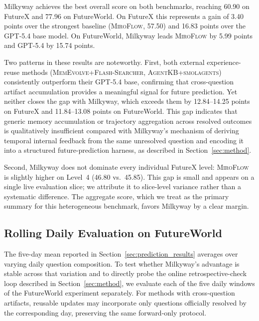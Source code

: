 Milkyway achieves the best overall score on both benchmarks, reaching 60.90 on FutureX and 77.96 on FutureWorld. On FutureX this represents a gain of 3.40 points over the strongest baseline (\textsc{MiroFlow}, 57.50) and 16.83 points over the GPT-5.4 base model. On FutureWorld, Milkyway leads \textsc{MiroFlow} by 5.99 points and GPT-5.4 by 15.74 points.

Two patterns in these results are noteworthy. First, both external experience-reuse methods (\textsc{MemEvolve+Flash-Searcher}, \textsc{AgentKB+smolagents}) consistently outperform their GPT-5.4 base, confirming that cross-question artifact accumulation provides a meaningful signal for future prediction. Yet neither closes the gap with Milkyway, which exceeds them by 12.84--14.25 points on FutureX and 11.84--13.08 points on FutureWorld. This gap indicates that generic memory accumulation or trajectory aggregation across resolved outcomes is qualitatively insufficient compared with Milkyway's mechanism of deriving temporal internal feedback from the same unresolved question and encoding it into a structured future-prediction harness, as described in Section~\ref{sec:method}.

Second, Milkyway does not dominate every individual FutureX level: \textsc{MiroFlow} is slightly higher on Level~4 (46.80 vs.\ 45.85). This gap is small and appears on a single live evaluation slice; we attribute it to slice-level variance rather than a systematic difference. The aggregate score, which we treat as the primary summary for this heterogeneous benchmark, favors Milkyway by a clear margin.

\subsection{Rolling Daily Evaluation on FutureWorld}
\label{sec:evolution_dynamics}

The five-day mean reported in Section~\ref{sec:prediction_results} averages over varying daily question composition. To test whether Milkyway's advantage is stable across that variation and to directly probe the online retrospective-check loop described in Section~\ref{sec:method}, we evaluate each of the five daily windows of the FutureWorld experiment separately. For methods with cross-question artifacts, reusable updates may incorporate only questions officially resolved by the corresponding day, preserving the same forward-only protocol.

